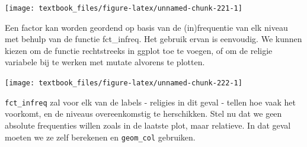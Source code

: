 \documentclass[]{tufte-book}
\newenvironment{Shaded}{}{}
\newcommand{\DataTypeTok}[1]{\textcolor[rgb]{0.56,0.13,0.00}{#1}}
\newcommand{\KeywordTok}[1]{\textcolor[rgb]{0.00,0.44,0.13}{\textbf{#1}}}
\newcommand{\NormalTok}[1]{#1}
\newcommand{\OperatorTok}[1]{\textcolor[rgb]{0.40,0.40,0.40}{#1}}
\newcommand{\StringTok}[1]{\textcolor[rgb]{0.25,0.44,0.63}{#1}}
\begin{document}
\begin{Shaded}
\end{Shaded}

\texttt{[image: textbook\_files/figure-latex/unnamed-chunk-221-1]}

Een factor kan worden geordend op basis van de (in)frequentie van elk niveau met behulp van de functie fct\_infreq. Het gebruik ervan is eenvoudig. We kunnen kiezen om de functie rechtstreeks in ggplot toe te voegen, of om de religie variabele bij te werken met mutate alvorens te plotten.

\begin{Shaded}
\end{Shaded}

\texttt{[image: textbook\_files/figure-latex/unnamed-chunk-222-1]}

\texttt{fct\_infreq} zal voor elk van de labels - religies in dit geval - tellen hoe vaak het voorkomt, en de niveaus overeenkomstig te herschikken. Stel nu dat we geen absolute frequenties willen zoals in de laatste plot, maar relatieve. In dat geval moeten we ze zelf berekenen en \texttt{geom\_col} gebruiken.

\begin{Shaded}
\end{Shaded}
\end{document}
